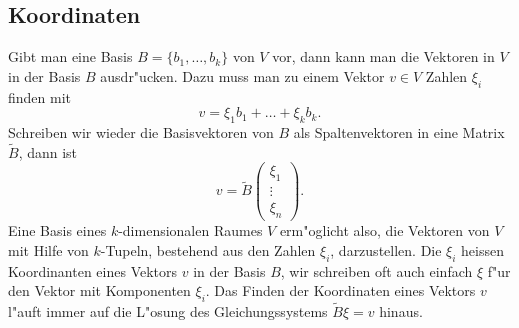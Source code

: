 \subsection{Koordinaten}
Gibt man eine Basis $B=\{b_1,\dots,b_k\}$ von $V$ vor,
dann kann man die Vektoren
in $V$ in der Basis $B$ ausdr"ucken.
Dazu muss man zu einem 
Vektor $v\in V$ Zahlen $\xi_i$ finden mit
\[
v=\xi_1 b_1+\dots +\xi_k b_k.
\]
Schreiben wir wieder die Basisvektoren von $B$ als Spaltenvektoren in 
eine Matrix $\tilde B$, dann ist 
\[
v=\tilde B\begin{pmatrix}\xi_1\\\vdots\\\xi_n\end{pmatrix}.
\]
Eine Basis eines $k$-dimensionalen Raumes $V$ erm"oglicht also,
die Vektoren von $V$ mit Hilfe von $k$-Tupeln, bestehend
aus den Zahlen $\xi_i$, darzustellen.
Die $\xi_i$ heissen
Koordinanten eines Vektors $v$ in der Basis $B$, wir schreiben
oft auch einfach $\xi$ f"ur den Vektor mit Komponenten $\xi_i$.
Das Finden der Koordinaten eines Vektors $v$ l"auft immer auf die L"osung
des Gleichungssystems $\tilde B\xi=v$ hinaus.

